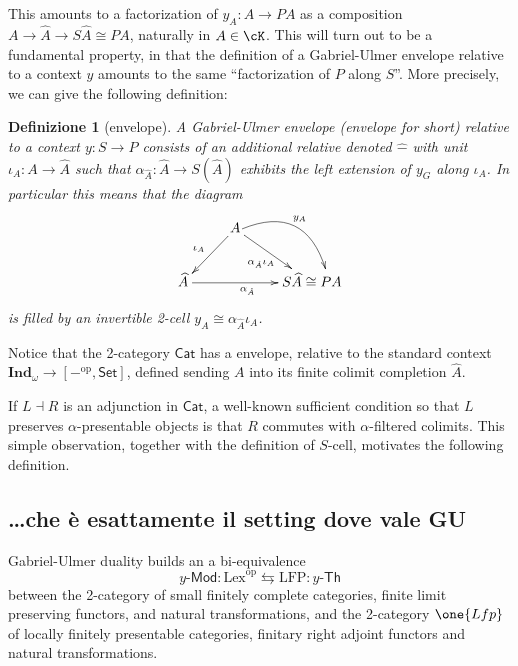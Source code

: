 \documentclass[11pt]{article}
\def\Cat{\mathsf{Cat}}
\def\Set{\mathsf{Set}}
\def\opp{\mathrm{op}}
\theoremstyle{reference}
\newtheorem{definition}[theorem]{Definizione}
\begin{document}
\begin{prop}
This amounts to a factorization of \(y_A : A \to P A\) as a composition \(A\to \widehat A \to S \widehat A\cong P A\), naturally in \(A\in\cK\). This will turn out to be a fundamental property, in that the definition of a Gabriel\hyp{}Ulmer envelope relative to a context \(y\) amounts to the same ``factorization of \(P\) along \(S\)''. More precisely, we can give the following definition:
\begin{definition}[\gu envelope]\label{guenvelope}
	A \emph{Gabriel\hyp{}Ulmer envelope} (\emph{\gu envelope} for short) relative to a context $y : S\to P$ consists of an additional relative \kz{} denoted $\widehat{ - }$ with unit $\iota_A : A\to \widehat A$ such that $ \alpha_{\hat A} : \widehat A \to S(\widehat A)$ exhibits the left extension of $y_G$ along $\iota_A$. In particular this means that the diagram
	\[
		\vcenter{\xymatrix{
		&A\ar[dr]_{ \alpha_{\hat A}\iota_A}\ar[dl]_{\iota_A}&\\
		\widehat A\ar[rr]_{ \alpha_{\hat A}} && S \widehat A \cong P A
		\ar@/^1.5pc/(15,0);(36,-10)^{y_A}
		}}
	\]
	is filled by an invertible 2-cell $y_A \cong  \alpha_{\hat A}\iota_A$.
\end{definition}
Notice that the 2-category \(\Cat\) has a \gu envelope, relative to the standard context \(\boldsymbol{Ind}_\omega\to [ - ^\opp,\Set]\), defined sending \(A\) into its finite colimit completion \(\widehat A\).
\begin{rmk}
	If $L\dashv R$ is an adjunction in $\Cat$, a well-known sufficient condition so that $L$ preserves $\alpha$-presentable objects is that $R$ commutes with $\alpha$-filtered colimits.
	This simple observation, together with the definition of $S$-cell, motivates the following definition.
\end{rmk}


\subsection{\ldots{}che è esattamente il setting dove vale GU}
\label{sec:org3fcd3b7}

Gabriel\hyp{}Ulmer duality builds an a bi\hyp{}equivalence
\[
	y\textsf{-Mod} : \text{Lex}^\opp \leftrightarrows \text{LFP} : y\textsf{-Th}
\]
between the 2-category of small finitely complete categories, finite limit preserving functors, and natural transformations, and the 2-category \(\one{Lfp}\) of locally finitely presentable categories, finitary right adjoint functors and natural transformations.


\end{prop}
\end{document}

